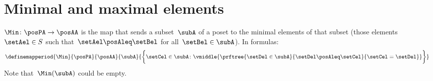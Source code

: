 \section{Minimal and maximal elements}

\begin{ctdefinition}
    \label{def:Min}
    $\Min \colon \posPA \to \posAA$ is the map that sends a subset~$\subA$ of a poset to the minimal elements of that subset (those elements~$\setAel \in S$ such that~$\setAel \posAleq \setBel$ for all~$\setBel \in \subA$).
    In formulas:
    \begin{equation*}
    \definemapperiod{\Min}{\posPA}{\posAA}{\subA}{\bigg\{
                                                              \setCel\in \subA\colon
                                                              \vmiddle{
                                                                  \prftree{
                                                                      \setDel\in \subA
                                                                  }{
                                                                      \setDel\posAleq \setCel
                                                                  }{
                                                                      \setCel=\setDel
                                                                  }
                                                              }
                                                              \bigg\}}
    \end{equation*}
    Note that~$\Min(\subA)$ could be empty.
\end{ctdefinition}


